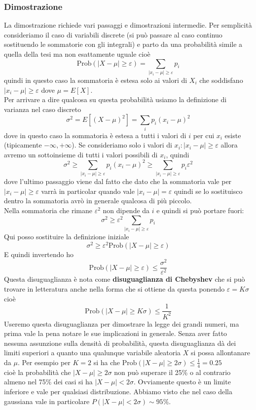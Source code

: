 \documentclass[openany,a4paper,12pt]{book}
\theoremstyle{remark}
\begin{document}
\subsubsection*{Dimostrazione}
La dimostrazione richiede vari passaggi e dimostrazioni intermedie. Per semplicità consideriamo il caso di variabili discrete (si può passare al caso continuo sostituendo le sommatorie con gli integrali) e parto da una probabilità simile a quella della tesi ma non esattamente uguale cioè
\[
\text{Prob}(|X - \mu| \ge \varepsilon) = \sum_{|x_i - \mu| \ge \varepsilon} p_i
\]
quindi in questo caso la sommatoria è estesa solo ai valori di $X_i$ che soddisfano $|x_i - \mu| \ge \varepsilon$ dove $\mu = E[X]$. \\
Per arrivare a dire qualcosa su questa probabilità usiamo la definizione di varianza nel caso discreto
\[
\sigma^2 = E[(X - \mu)^2] = \sum_i p_i (x_i - \mu)^2
\]
dove in questo caso la sommatoria è estesa a tutti i valori di $i$ per cui $x_i$ esiste (tipicamente $-\infty, +\infty$). Se consideriamo solo i valori di $x_i : |x_i - \mu| \ge \varepsilon$ allora avremo un sottoinsieme di tutti i valori possibili di $x_i$, quindi
\[
\sigma^2 \ge \sum_{|x_i - \mu| \ge \varepsilon} p_i (x_i - \mu)^2 \ge \sum_{|x_i - \mu| \ge \varepsilon} p_i \varepsilon^2
\]
dove l'ultimo passaggio viene dal fatto che dato che la sommatoria vale per $|x_i - \mu| \ge \varepsilon$ varrà in particolar quando vale $|x_i - \mu| = \varepsilon$ quindi se lo sostituisco dentro la sommatoria avrò in generale qualcosa di più piccolo. \\
Nella sommatoria che rimane $\varepsilon^2$ non dipende da $i$ e quindi si può portare fuori:
\[
\sigma^2 \ge \varepsilon^2 \sum_{|x_i - \mu| \ge \varepsilon} p_i
\]
Qui posso sostituire la definizione iniziale
\[
\sigma^2 \ge \varepsilon^2 \text{Prob}(|X - \mu| \ge \varepsilon)
\]
E quindi invertendo ho
\[
\text{Prob}(|X - \mu| \ge \varepsilon) \le \frac{\sigma^2}{\varepsilon^2}
\]
Questa disuguaglianza è nota come \textbf{disuguaglianza di Chebyshev} che si può trovare in letteratura anche nella forma che si ottiene da questa ponendo $\varepsilon = K\sigma$ cioè
\[
\text{Prob}(|X - \mu| \ge K\sigma) \le \frac{1}{K^2}
\]
Useremo questa disuguaglianza per dimostrare la legge dei grandi numeri, ma prima vale la pena notare le sue implicazioni in generale. Senza aver fatto nessuna assunzione sulla densità di probabilità, questa disuguaglianza dà dei limiti superiori a quanto una qualunque variabile aleatoria $X$ si possa allontanare da $\mu$. Per esempio per $K=2$ si ha che $\text{Prob}(|X - \mu| \ge 2\sigma) \le \frac{1}{4} = 0.25$ \\
cioè la probabilità che $|X - \mu| \ge 2\sigma$ non può superare il 25\% o al contrario almeno nel 75\% dei casi si ha $|X - \mu| < 2\sigma$. Ovviamente questo è un limite inferiore e vale per qualsiasi distribuzione. Abbiamo visto che nel caso della gaussiana vale in particolare $P(|X - \mu| < 2\sigma) \sim 95\%$.
\end{document}
